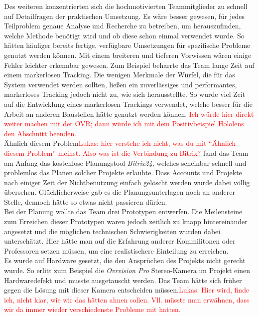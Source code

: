 Des weiteren konzentrierten sich die hochmotivierten Teammitglieder zu schnell auf Detailfragen der praktischen Umsetzung. Es wäre besser gewesen, für jedes Teilproblem genaue Analyse und Recherche zu betreiben, um herauszufinden, welche Methode benötigt wird und ob diese schon einmal verwendet wurde. So hätten häufiger bereits fertige, verfügbare Umsetzungen für spezifische Probleme genutzt werden können. Mit einem breiteren und tieferen Vorwissen wären einige Fehler leichter erkennbar gewesen. Zum Beispiel beharrte das Team lange Zeit auf einem markerlosen Tracking. Die wenigen Merkmale der Würfel, die für das System verwendet werden sollten, ließen ein zuverlässiges und performantes, markerloses Tracking jedoch nicht zu, wie sich herausstellte. So wurde viel Zeit auf die Entwicklung eines markerlosen Trackings verwendet, welche besser für die Arbeit an anderen Baustellen hätte genutzt werden können. \textcolor{red}{Ich würde hier direkt weiter machen mit der OVR; dann würde ich mit dem Positivbeispiel Hololens den Abschnitt beenden.}\\
Ähnlich diesem Problem\textcolor{red}{Lukas: hier verstehe ich nicht, was du mit "`Ähnlich diesem Problem"' meinst. Also was ist die Verbindung zu Bitrix?} fand das Team am Anfang das kostenlose Planungstool \textit{Bitrix24}, welches scheinbar schnell und problemlos das Planen solcher Projekte erlaubte. Dass Accounts und Projekte nach einiger Zeit der Nichtbenutzung einfach gelöscht werden wurde dabei völlig übersehen. Glücklicherweise gab es die Planungsunterlagen noch an anderer Stelle, dennoch hätte so etwas nicht passieren dürfen.\\
Bei der Planung wollte das Team drei Prototypen entwerfen. Die Meilensteine zum Erreichen dieser Prototypen waren jedoch zeitlich zu knapp hintereinander angesetzt und die möglichen technischen Schwierigkeiten wurden dabei unterschätzt. Hier hätte man auf die Erfahrung anderer Kommilitonen oder Professoren setzen müssen, um eine realistischere Einteilung zu erreichen.\\
Es wurde auf Hardware gesetzt, die den Ansprüchen des Projekts nicht gerecht wurde. So erlitt zum Beispiel die \textit{Ovrvision Pro} Stereo-Kamera im Projekt einen Hardwaredefekt und musste ausgetauscht werden. Das Team hätte sich früher gegen die Lösung mit dieser Kamera entscheiden müssen.\textcolor{red}{Lukas: Hier wird, finde ich, nicht klar, wie wir das hätten ahnen sollen. Vll. müsste man erwähnen, dass wir da immer wieder verschiedenste Probleme mit hatten.}\\
